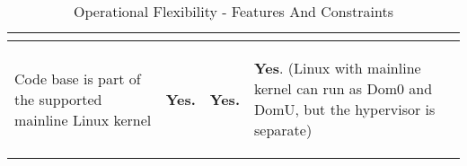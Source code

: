 \begin{table}[H]
\begin{center}
\begin{tabular}{ | p{3.25cm} | p{3.25cm} | p{3.25cm} | p{3.25cm} |}
\begin{flushleft}
      \end{flushleft} \\ \hline
      \begin{flushleft}
      Code base is part of the supported mainline Linux kernel
      \end{flushleft} & \begin{flushleft}
      \textbf{Yes.}
      \end{flushleft} & \begin{flushleft}
      \textbf{Yes.} 
      \end{flushleft} & \begin{flushleft}
      \textbf{Yes}. (Linux with mainline kernel can run as Dom0 and DomU, but the hypervisor is separate)
      \end{flushleft} \\ \hline
\end{tabular}
\end{center}
\caption{Operational Flexibility - Features And Constraints}
\label{table:features}
\end{table}



